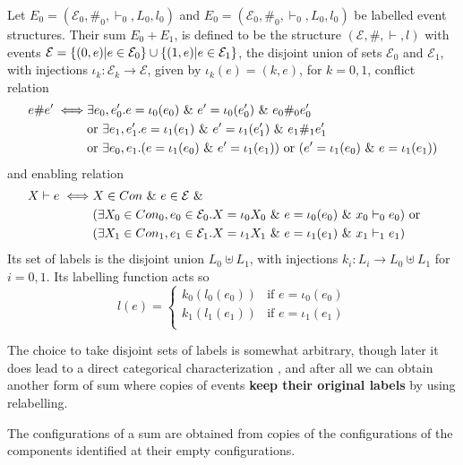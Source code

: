 \documentclass{article}
\begin{document}
\begin{definition}
Let $E_0 = (\mathcal{E}_0,\#_0,\vdash_0,L_0,l_0)$ and 
$E_0 = (\mathcal{E}_0,\#_0,\vdash_0,L_0,l_0)$ be labelled event structures.
Their sum $E_0 + E_1$, is defined to be the structure $(\mathcal{E},\#,\vdash,l)$
with events $\mathcal{E} = \{(0,e)|e \in \mathcal{E}_0\} \cup \{(1,e)|e \in \mathcal{E}_1\}$,
the disjoint union of sets $\mathcal{E}_0$ and $\mathcal{E}_1$,
with injections $\iota_k: \mathcal{E}_k \rightarrow \mathcal{E}$, given by
$\iota_k(e) = (k,e)$, for $k=0,1$, conflict relation
\begin{align*}
    e \# e' \iff & \exists e_0,e_0'. e = \iota_0(e_0) 
    \ \& \  e' = \iota_0(e_0') \ \& \  e_0 \#_0e_0' \\
    & \text{or } \exists e_1,e_1'. e = \iota_1(e_1) \ \& \ 
     e' = \iota_1(e_1') \ \& \  e_1 \#_1 e_1' \\
    & \text{or } \exists e_0,e_1.(e=\iota_1(e_0)
    \ \& \  e' =\iota_1(e_1)) \text{ or }
    (e'=\iota_1(e_0) \ \& \  e =\iota_1(e_1))
\end{align*}
and enabling relation
\begin{align*}
    X \vdash e \iff & X \in Con \ \& \  e \in \mathcal{E} \ \& \  & \\
    & (\exists X_0 \in Con_0,e_0 \in \mathcal{E}_0.X = \iota_0X_0 
    \ \& \  e = \iota_0(e_0) \ \& \  x_0 \vdash_0 e_0) \text{ or } \\
    & (\exists X_1 \in Con_1,e_1 \in \mathcal{E}_1.X = \iota_1X_1 
    \ \& \  e = \iota_1(e_1) \ \& \  x_1 \vdash_1 e_1) \\
\end{align*}
Its set of labels is the disjoint union $L_0\uplus L_1$, with injections $k_i: L_i \rightarrow L_0 \uplus L_1$ 
for $i =0,1$. Its labelling function acts so
$$
    l(e) = \begin{cases}
        k_0(l_0(e_0)) & \text{if } e= \iota_0(e_0) \\
        k_1(l_1(e_1)) & \text{if } e= \iota_1(e_1) \\
    \end{cases}
$$
\end{definition}
The choice to take disjoint sets of labels is somewhat arbitrary, though later it does lead
to a direct categorical characterization , and after all we can obtain another form of sum 
where copies of events \textbf{keep their original labels} by using relabelling.

The configurations of a sum are obtained from copies of the configurations of the components
identified at their empty configurations.
\end{document}
